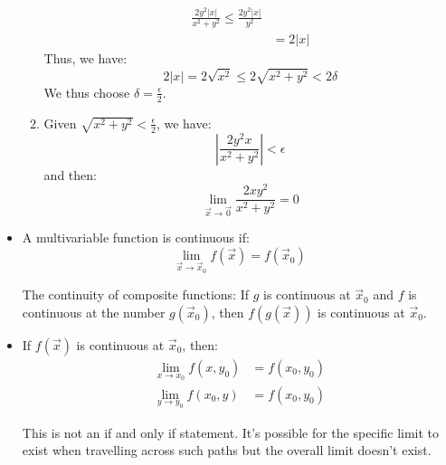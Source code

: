 \begin{itemize}
\begin{example}
\begin{enumerate}
\begin{align}
                \frac{2y^2|x|}{x^2+y^2} \le \frac{2y^2|x|}{y^2} \\ 
                &= 2|x|
            \end{align}
            Thus, we have:
            \begin{equation}
                2|x| = 2\sqrt{x^2} \le 2\sqrt{x^2+y^2} < 2\delta
            \end{equation}
            We thus choose $\delta = \frac{\epsilon}{2}$.
            \item Given $\sqrt{x^2+y^2}<\frac{\epsilon}{2}$, we have:
            \begin{equation}
                \left|\frac{2y^2x}{x^2+y^2}\right| < \epsilon
            \end{equation}
            and then:
            \begin{equation}
                \lim_{\vec{x}\to\vec{0}} \frac{2xy^2}{x^2+y^2}=0
            \end{equation}            
        \end{enumerate}
    \end{example}
    \item A multivariable function is continuous if:
    \begin{equation}
        \lim_{\vec{x}\to\vec{x}_0} f(\vec{x})=f(\vec{x}_0)
    \end{equation}
    \begin{theorem}
        The continuity of composite functions: If $g$ is continuous at $\vec{x}_0$ and $f$ is continuous at the number $g(\vec{x}_0)$, then $f(g(\vec{x}))$ is continuous at $\vec{x}_0$.
    \end{theorem}
    \item If $f(\vec{x})$ is continuous at $\vec{x}_0$, then:
    \begin{align}
        \lim_{x\to x_0} f(x,y_0) &= f(x_0, y_0) \\ 
        \lim_{y\to y_0} f(x_0, y) &= f(x_0,y_0)
    \end{align}
    \begin{warning}
        This is not an if and only if statement. It's possible for the specific limit to exist when travelling across such paths but the overall limit doesn't exist.
    \end{warning}
\end{itemize}